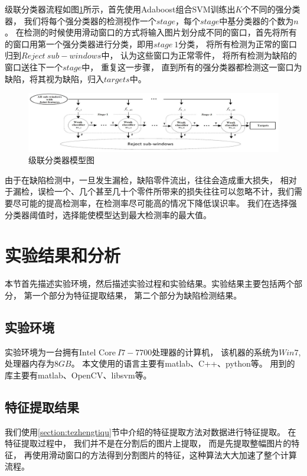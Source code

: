 级联分类器流程如图\ref{fig:cascade}所示，首先使用Adaboost组合SVM训练出$K$个不同的强分类器，
我们将每个强分类器的检测视作一个$stage$，每个$stage$中基分类器的个数为$n$。
在检测的时候使用滑动窗口的方式将输入图片划分成不同的窗口，首先将所有的窗口用第一个强分类器进行分类，即用$stage~1$分类，
将所有检测为正常的窗口归到$Reject~sub-windows$中，
认为这些窗口为正常零件，
将所有检测为缺陷的窗口送往下一个$stage$中，
重复这一步骤，
直到所有的强分类器都检测这一窗口为缺陷，将其视为缺陷，归入$targets$中。
\begin{figure}[htbp]
\centering
\includegraphics[width=1.0\linewidth]{figures/cascade.png}
\caption{级联分类器模型图}
\label{fig:cascade}
\end{figure}

由于在缺陷检测中，一旦发生漏检，缺陷零件流出，往往会造成重大损失，
相对于漏检，误检一个、几个甚至几十个零件所带来的损失往往可以忽略不计，我们需要尽可能的提高检测率，在检测率尽可能高的情况下降低误识率。
我们在选择强分类器阈值时，选择能使模型达到最大检测率的最大值。


\section{实验结果和分析}
\label{section:shiyanjieguo}

本节首先描述实验环境，然后描述实验过程和实验结果。实验结果主要包括两个部分，
第一个部分为特征提取结果，
第二个部分为缺陷检测结果。

\subsection{实验环境}

实验环境为一台拥有$\mbox{Intel Core}
~I7-7700$处理器的计算机，
该机器的系统为$Win7$,
处理器内存为$8GB$。
本文使用的语言主要有matlab\cite{MATLAB:2017}、C++、python等。
用到的库主要有matlab\cite{MATLAB:2017}、OpenCV\cite{opencv_library}、libsvm\cite{CC01a}等。

\subsection{特征提取结果}

我们使用\ref{section:tezhengtiqu}节中介绍的特征提取方法对数据进行特征提取。
在特征提取过程中，
我们并不是在分割后的图片上提取，
而是先提取整幅图片的特征，
再使用滑动窗口的方法得到分割图片的特征，这种算法大大加速了整个计算流程。

